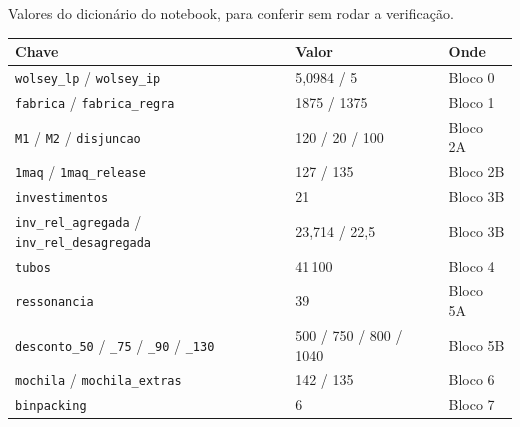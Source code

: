 Valores do dicionário  do notebook, para conferir sem rodar a verificação.
\begin{center}
\begin{tabular}{lll}
\toprule
Chave & Valor & Onde\\
\midrule
\texttt{wolsey\_lp} / \texttt{wolsey\_ip} & 5,0984 / 5 & Bloco 0\\
\texttt{fabrica} / \texttt{fabrica\_regra} & 1875 / 1375 & Bloco 1\\
\texttt{M1} / \texttt{M2} / \texttt{disjuncao} & 120 / 20 / 100 & Bloco 2A\\
\texttt{1maq} / \texttt{1maq\_release} & 127 / 135 & Bloco 2B\\
\texttt{investimentos} & 21 & Bloco 3B\\
\texttt{inv\_rel\_agregada} / \texttt{inv\_rel\_desagregada} & 23,714 / 22,5 & Bloco 3B\\
\texttt{tubos} & 41\,100 & Bloco 4\\
\texttt{ressonancia} & 39 & Bloco 5A\\
\texttt{desconto\_50} / \texttt{\_75} / \texttt{\_90} / \texttt{\_130} & 500 / 750 / 800 / 1040 & Bloco 5B\\
\texttt{mochila} / \texttt{mochila\_extras} & 142 / 135 & Bloco 6\\
\texttt{binpacking} & 6 & Bloco 7\\
\bottomrule
\end{tabular}
\end{center}
